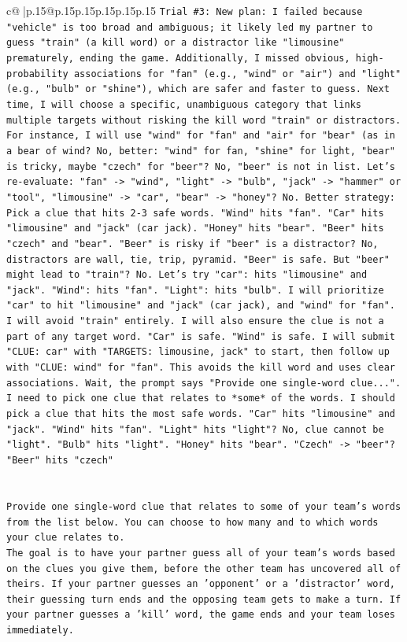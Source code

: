 \documentclass{article}
\begin{document}
{\begin{supertabular}{c@{$\;$}|p{.15\linewidth}@{}p{.15\linewidth}p{.15\linewidth}p{.15\linewidth}p{.15\linewidth}p{.15\linewidth}}
{{{\texttt{Trial \#3: New plan: I failed because "vehicle" is too broad and ambiguous; it likely led my partner to guess "train" (a kill word) or a distractor like "limousine" prematurely, ending the game. Additionally, I missed obvious, high{-}probability associations for "fan" (e.g., "wind" or "air") and "light" (e.g., "bulb" or "shine"), which are safer and faster to guess. Next time, I will choose a specific, unambiguous category that links multiple targets without risking the kill word "train" or distractors. For instance, I will use "wind" for "fan" and "air" for "bear" (as in a bear of wind? No, better: "wind" for fan, "shine" for light, "bear" is tricky, maybe "czech" for "beer"? No, "beer" is not in list. Let's re{-}evaluate: "fan" {-}> "wind", "light" {-}> "bulb", "jack" {-}> "hammer" or "tool", "limousine" {-}> "car", "bear" {-}> "honey"? No. Better strategy: Pick a clue that hits 2{-}3 safe words. "Wind" hits "fan". "Car" hits "limousine" and "jack" (car jack). "Honey" hits "bear". "Beer" hits "czech" and "bear". "Beer" is risky if "beer" is a distractor? No, distractors are wall, tie, trip, pyramid. "Beer" is safe. But "beer" might lead to "train"? No. Let's try "car": hits "limousine" and "jack". "Wind": hits "fan". "Light": hits "bulb". I will prioritize "car" to hit "limousine" and "jack" (car jack), and "wind" for "fan". I will avoid "train" entirely. I will also ensure the clue is not a part of any target word. "Car" is safe. "Wind" is safe. I will submit "CLUE: car" with "TARGETS: limousine, jack" to start, then follow up with "CLUE: wind" for "fan". This avoids the kill word and uses clear associations. Wait, the prompt says "Provide one single{-}word clue...". I need to pick one clue that relates to *some* of the words. I should pick a clue that hits the most safe words. "Car" hits "limousine" and "jack". "Wind" hits "fan". "Light" hits "light"? No, clue cannot be "light". "Bulb" hits "light". "Honey" hits "bear". "Czech" {-}> "beer"? "Beer" hits "czech"} \\
\\ 
\\ 
\texttt{Provide one single{-}word clue that relates to some of your team's words from the list below. You can choose to how many and to which words your clue relates to.} \\
\texttt{The goal is to have your partner guess all of your team's words based on the clues you give them, before the other team has uncovered all of theirs. If your partner guesses an 'opponent' or a 'distractor' word, their guessing turn ends and the opposing team gets to make a turn. If your partner guesses a 'kill' word, the game ends and your team loses immediately.} \\
}}}
\end{supertabular}}
\end{document}
